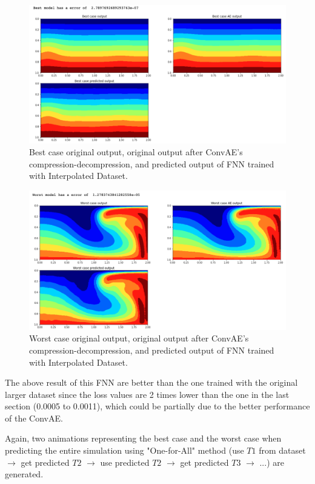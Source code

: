 \begin{figure}[H]
    \caption{Best case original output, original output after ConvAE's compression-decompression, and predicted output of FNN trained with Interpolated Dataset.}
    \includegraphics[scale=0.5]{figures/mantle_convection_images/larger_dataset_interpolated/FNN_Best.png}
\end{figure}

\begin{figure}[H]
    \caption{Worst case original output, original output after ConvAE's compression-decompression, and predicted output of FNN trained with Interpolated Dataset.}
    \includegraphics[scale=0.5]{figures/mantle_convection_images/larger_dataset_interpolated/FNN_Worst.png}
\end{figure}

The above result of this FNN are better than the one trained with the original larger dataset since the loss values are 2 times lower than the one in the last section (0.0005 to 0.0011), which could be partially due to the better performance of the ConvAE.

Again, two animations representing the best case and the worst case when predicting the entire simulation using "One-for-All" method (use $T1$ from dataset $\rightarrow$ get predicted $T2$ $\rightarrow$ use predicted $T2$ $\rightarrow$ get predicted $T3$ $\rightarrow$ ...) are generated.


